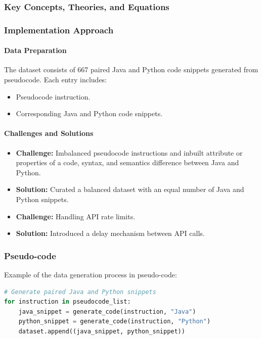\documentclass{dhbenelux}
\begin{document}
\subsubsection{Key Concepts, Theories, and Equations}




\subsubsection{Implementation Approach}

\paragraph{Data Preparation} The dataset consists of 667 paired Java and Python code snippets generated from pseudocode. Each entry includes:
\begin{itemize}
    \item Pseudocode instruction.
    \item Corresponding Java and Python code snippets.
\end{itemize}

\paragraph{Challenges and Solutions}
\begin{itemize}
    \item \textbf{Challenge:} Imbalanced pseudocode instructions and inbuilt attribute or properties of a code, syntax, and semantics difference between Java and Python.
    \item \textbf{Solution:} Curated a balanced dataset with an equal number of Java and Python snippets.
    \item \textbf{Challenge:} Handling API rate limits.
    \item \textbf{Solution:} Introduced a delay mechanism between API calls.
\end{itemize}

\subsubsection{Pseudo-code}

\noindent Example of the data generation process in pseudo-code:
\begin{lstlisting}[language=Python, caption={Pseudocode for Dataset Preparation}]
# Generate paired Java and Python snippets
for instruction in pseudocode_list:
    java_snippet = generate_code(instruction, "Java")
    python_snippet = generate_code(instruction, "Python")
    dataset.append((java_snippet, python_snippet))
\end{lstlisting}
\end{document}
